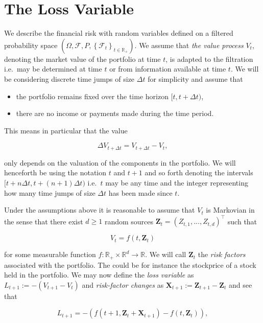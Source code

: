 \documentclass[a4paper,10pt,openany]{book}
\providecommand{\tightlist}{%
 \setlength{\itemsep}{0pt}\setlength{\parskip}{0pt}}
\begin{document}
\hypertarget{the-loss-variable}{%
\section{The Loss Variable}\label{the-loss-variable}}

We describe the financial risk with random variables defined on a filtered probability space \(\left(\Omega,\mathcal{F},P,\left\{\mathcal{F}_t\right\}_{t\in \mathbb{R}_+}\right)\). We assume that \emph{the value process} \(V_t\), denoting the market value of the portfolio at time \(t\), is adapted to the filtration i.e.~may be determined at time \(t\) or from information available at time \(t\). We will be considering discrete time jumps of size \(\Delta t\) for simplicity and assume that

\begin{itemize}
\tightlist
\item
  the portfolio remains fixed over the time horizon \([t,t+\Delta t)\),
\item
  there are no income or payments made during the time period.
\end{itemize}

This means in particular that the value

\[
\Delta V_{t+\Delta t}=V_{t+\Delta t}-V_t,
\]

only depends on the valuation of the components in the portfolio. We will henceforth be using the notation \(t\) and \(t+1\) and so forth denoting the intervals \([t+n\Delta t,t+(n+1)\Delta t)\) i.e.~\(t\) may be any time and the integer representing how many time jumps of size \(\Delta t\) has been made since \(t\).

Under the assumptions above it is reasonable to assume that \(V_t\) is Markovian in the sense that there exist \(d\ge 1\) random sources \(\mathbf{Z}_t=(Z_{t,1},...,Z_{t,d})^\top\) such that

\[
V_t=f(t,\mathbf{Z}_t)\tag{2.2}
\]

for some measurable function \(f : \mathbb{R}_+\times \mathbb{R}^d\to\mathbb{R}\). We will call \(\mathbf{Z}_t\) the \emph{risk factors} associated with the portfolio. The could be for instance the stockprice of a stock held in the portfolio. We may now define the \emph{loss variable} as \(L_{t+1}:=-(V_{t+1}-V_t)\) and \emph{risk-factor changes} as \(\mathbf{X}_{t+1}:=\mathbf{Z}_{t+1}-\mathbf{Z}_t\) and see that

\[
L_{t+1}=-\left(f(t+1,\mathbf{Z}_t+\mathbf{X}_{t+1})-f(t,\mathbf{Z}_t)\right),\tag{2.3}
\]
\end{document}
